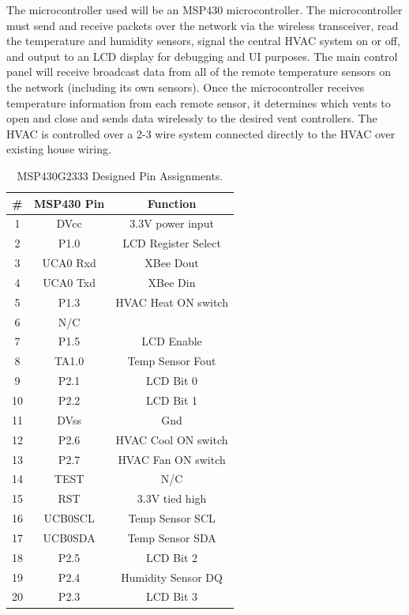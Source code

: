 The microcontroller used will be an MSP430 microcontroller. The microcontroller must send and receive packets over the network via the wireless transceiver, read the temperature and humidity sensors, signal the central HVAC system on or off, and output to an LCD display for debugging and UI purposes. The main control panel will receive broadcast data from all of the remote temperature sensors on the network (including its own sensors). Once the microcontroller receives temperature information from each remote sensor, it determines which vents to open and close and sends data wirelessly to the desired vent controllers. The HVAC is controlled over a 2-3 wire system connected directly to the HVAC over existing house wiring.
\begin{table}[htbp]
\centering
\caption{MSP430G2333 Designed Pin Assignments.}
\begin{tabular}{|c|c|c|}
\hline
\textbf{\#} & \textbf{MSP430 Pin} & \textbf{Function} \bigstrut\\
\hline
\hline
1 & DVcc & 3.3V power input \bigstrut\\
\hline
2 & P1.0 & LCD Register Select \bigstrut\\
\hline
3 & UCA0 Rxd & XBee Dout \bigstrut\\
\hline
4 & UCA0 Txd & XBee Din \bigstrut\\
\hline
5 & P1.3 & HVAC Heat ON switch \bigstrut\\
\hline
6 & N/C \bigstrut\\
\hline
7 & P1.5 & LCD Enable \bigstrut\\
\hline
8 & TA1.0 & Temp Sensor Fout \bigstrut\\
\hline
9 & P2.1 & LCD Bit 0 \bigstrut\\
\hline
10 & P2.2 & LCD Bit 1 \bigstrut\\
\hline
11 & DVss & Gnd \bigstrut\\
\hline
12 & P2.6 & HVAC Cool ON switch \bigstrut\\
\hline
13 & P2.7 & HVAC Fan ON switch \bigstrut\\
\hline
14 & TEST & N/C \bigstrut\\
\hline
15 & RST & 3.3V tied high \bigstrut\\
\hline
16 & UCB0SCL & Temp Sensor SCL \bigstrut\\
\hline
17 & UCB0SDA & Temp Sensor SDA \bigstrut\\
\hline
18 & P2.5 & LCD Bit 2 \bigstrut\\
\hline
19 & P2.4 & Humidity Sensor DQ \bigstrut\\
\hline
20 & P2.3 & LCD Bit 3 \bigstrut\\
\hline
\end{tabular}%
\label{tab:msp_inout}%
\end{table}%


